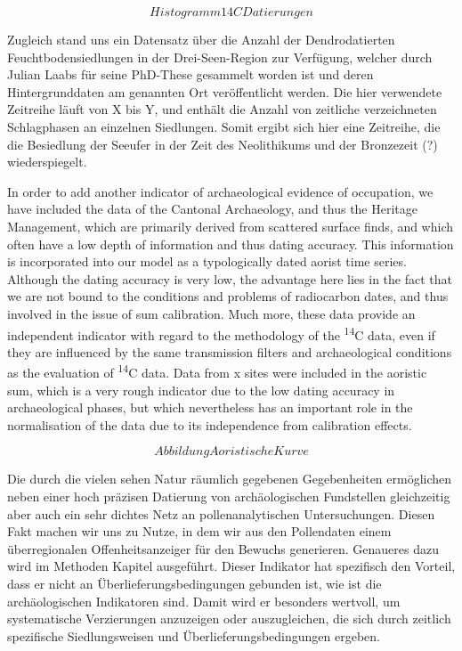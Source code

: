 \documentclass[
]{article}
\begin{document}
\[Histogramm 14C Datierungen\]

Zugleich stand uns ein Datensatz über die Anzahl der Dendrodatierten Feuchtbodensiedlungen in der Drei-Seen-Region zur Verfügung, welcher durch Julian Laabs für seine PhD-These gesammelt worden ist und deren Hintergrunddaten am genannten Ort veröffentlicht werden. Die hier verwendete Zeitreihe läuft von X bis Y, und enthält die Anzahl von zeitliche verzeichneten Schlagphasen an einzelnen Siedlungen. Somit ergibt sich hier eine Zeitreihe, die die Besiedlung der Seeufer in der Zeit des Neolithikums und der Bronzezeit (?) wiederspiegelt.

In order to add another indicator of archaeological evidence of occupation, we have included the data of the Cantonal Archaeology, and thus the Heritage Management, which are primarily derived from scattered surface finds, and which often have a low depth of information and thus dating accuracy. This information is incorporated into our model as a typologically dated aorist time series. Although the dating accuracy is very low, the advantage here lies in the fact that we are not bound to the conditions and problems of radiocarbon dates, and thus involved in the issue of sum calibration. Much more, these data provide an independent indicator with regard to the methodology of the \textsuperscript{14}C data, even if they are influenced by the same transmission filters and archaeological conditions as the evaluation of \textsuperscript{14}C data. Data from x sites were included in the aoristic sum, which is a very rough indicator due to the low dating accuracy in archaeological phases, but which nevertheless has an important role in the normalisation of the data due to its independence from calibration effects.

\[Abbildung Aoristische Kurve\]

Die durch die vielen sehen Natur räumlich gegebenen Gegebenheiten ermöglichen neben einer hoch präzisen Datierung von archäologischen Fundstellen gleichzeitig aber auch ein sehr dichtes Netz an pollenanalytischen Untersuchungen. Diesen Fakt machen wir uns zu Nutze, in dem wir aus den Pollendaten einem überregionalen Offenheitsanzeiger für den Bewuchs generieren. Genaueres dazu wird im Methoden Kapitel ausgeführt. Dieser Indikator hat spezifisch den Vorteil, dass er nicht an Überlieferungsbedingungen gebunden ist, wie ist die archäologischen Indikatoren sind. Damit wird er besonders wertvoll, um systematische Verzierungen anzuzeigen oder auszugleichen, die sich durch zeitlich spezifische Siedlungsweisen und Überlieferungsbedingungen ergeben.
\end{document}

